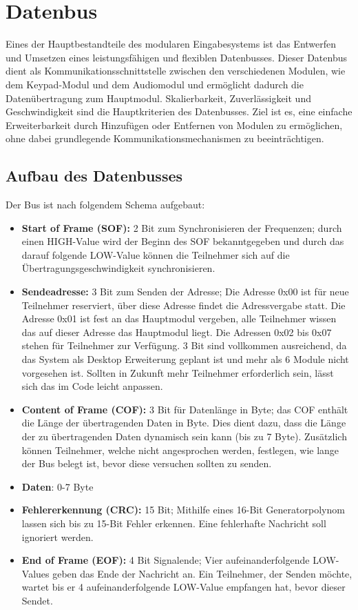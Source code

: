 \section{Datenbus}
Eines der Hauptbestandteile des modularen Eingabesystems ist das Entwerfen und Umsetzen eines leistungsfähigen und flexiblen Datenbusses. Dieser Datenbus dient als Kommunikationsschnittstelle zwischen den verschiedenen Modulen, wie dem Keypad-Modul und dem Audiomodul und ermöglicht dadurch die Datenübertragung zum Hauptmodul. Skalierbarkeit, Zuverlässigkeit und Geschwindigkeit sind die Hauptkriterien des Datenbusses. Ziel ist es, eine einfache Erweiterbarkeit durch Hinzufügen oder Entfernen von Modulen zu ermöglichen, ohne dabei grundlegende Kommunikationsmechanismen zu beeinträchtigen.

\subsection{Aufbau des Datenbusses}
Der Bus ist nach folgendem Schema aufgebaut:
\begin{itemize}
	\item \textbf{Start of Frame (SOF):} 2 Bit zum Synchronisieren der Frequenzen; durch einen HIGH-Value wird der Beginn des SOF bekanntgegeben und durch das darauf folgende LOW-Value können die Teilnehmer sich auf die Übertragungsgeschwindigkeit synchronisieren.
	\item \textbf{Sendeadresse:} 3 Bit zum Senden der Adresse; Die Adresse 0x00 ist für neue Teilnehmer reserviert, über diese Adresse findet die Adressvergabe statt. Die Adresse 0x01 ist fest an das Hauptmodul vergeben, alle Teilnehmer wissen das auf dieser Adresse das Hauptmodul liegt. Die Adressen 0x02 bis 0x07 stehen für Teilnehmer zur Verfügung. 3 Bit sind vollkommen ausreichend, da das System als Desktop Erweiterung geplant ist und mehr als 6 Module nicht vorgesehen ist. Sollten in Zukunft mehr Teilnehmer erforderlich sein, lässt sich das im Code leicht anpassen.
	\item \textbf{Content of Frame (COF):} 3 Bit für Datenlänge in Byte; das COF enthält die Länge der übertragenden Daten in Byte. Dies dient dazu, dass die Länge der zu übertragenden Daten dynamisch sein kann (bis zu 7 Byte). Zusätzlich können Teilnehmer, welche nicht angesprochen werden, festlegen, wie lange der Bus belegt ist, bevor diese versuchen sollten zu senden.
	\item \textbf{Daten}: 0-7 Byte
	\item \textbf{Fehlererkennung (CRC):} 15 Bit; Mithilfe eines 16-Bit Generatorpolynom lassen sich bis zu 15-Bit Fehler erkennen. Eine fehlerhafte Nachricht soll ignoriert werden. 
	\item \textbf{End of Frame (EOF):} 4 Bit Signalende; Vier aufeinanderfolgende LOW-Values geben das Ende der Nachricht an. Ein Teilnehmer, der Senden möchte, wartet bis er 4 aufeinanderfolgende LOW-Value empfangen hat, bevor dieser Sendet.
\end{itemize}

